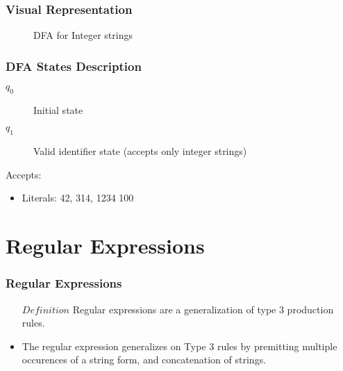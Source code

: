 \documentclass{beamer}
\begin{document}
\begin{frame}
    \frametitle{Visual Representation}
\begin{figure}
    \centering
    \caption{DFA for Integer strings}
\end{figure}
\end{frame}

\begin{frame}
    \frametitle{DFA States Description}
    \begin{description}
        \item[$q_0$] Initial state
        \item[$q_1$] Valid identifier state (accepts only integer strings)
    \end{description}
    
    Accepts:
    \begin{itemize}
        \item Literals: 42, 314, 1234 100
    \end{itemize}
\end{frame}

\section{Regular Expressions}

\begin{frame}
    \frametitle{Regular Expressions}
    \begin{itemize}
        \item[\( Definition \)] Regular expressions are a generalization of type 3 production rules.
        \item The regular expression generalizes on Type 3 rules by premitting multiple occurences of a string form, and concatenation of strings.

    \end{itemize}
\end{frame}
\end{document}
